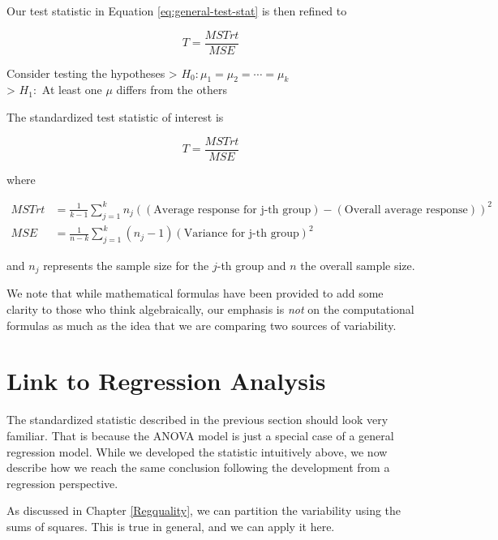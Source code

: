 \documentclass[
]{book}
\theoremstyle{plain}
\theoremstyle{mydefn}
\theoremstyle{myexmpl}
\theoremstyle{remark}
\begin{document}
Our test statistic in Equation \eqref{eq:general-test-stat} is then refined to

\begin{equation}
  T = \frac{MSTrt}{MSE}
  \label{eq:anova-test-stat}
\end{equation}

\begin{rmdtip}
Consider testing the hypotheses
\textgreater{} \(H_0: \mu_1 = \mu_2 = \dotsb = \mu_k\)\\
\textgreater{} \(H_1:\) At least one \(\mu\) differs from the others

The standardized test statistic of interest is

\[
  T = \frac{MSTrt}{MSE}
\]

where

\[
\begin{aligned}
  MSTrt &= \frac{1}{k-1} \sum_{j=1}^{k} n_j \left((\text{Average response for j-th group}) - (\text{Overall average response})\right)^2 \\
  MSE &= \frac{1}{n-k} \sum_{j=1}^{k} \left(n_j - 1\right) (\text{Variance for j-th group})^2
\end{aligned}
\]

and \(n_j\) represents the sample size for the \(j\)-th group and \(n\) the overall sample size.
\end{rmdtip}

We note that while mathematical formulas have been provided to add some clarity to those who think algebraically, our emphasis is \emph{not} on the computational formulas as much as the idea that we are comparing two sources of variability.

\hypertarget{link-to-regression-analysis}{%
\section{Link to Regression Analysis}\label{link-to-regression-analysis}}

The standardized statistic described in the previous section should look very familiar. That is because the ANOVA model is just a special case of a general regression model. While we developed the statistic intuitively above, we now describe how we reach the same conclusion following the development from a regression perspective.

As discussed in Chapter \ref{Regquality}, we can partition the variability using the sums of squares. This is true in general, and we can apply it here.
\end{document}
